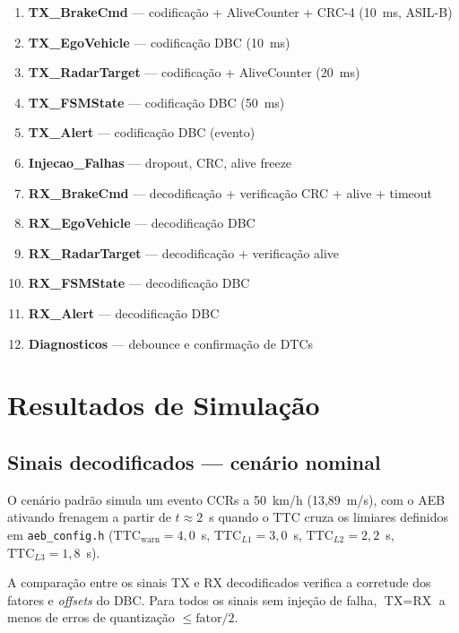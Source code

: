 \documentclass[12pt,a4paper]{article}
\begin{document}
\begin{enumerate}
  \item \textbf{TX\_BrakeCmd} --- codificação + AliveCounter + CRC-4
    (10~ms, ASIL-B)
  \item \textbf{TX\_EgoVehicle} --- codificação DBC (10~ms)
  \item \textbf{TX\_RadarTarget} --- codificação + AliveCounter (20~ms)
  \item \textbf{TX\_FSMState} --- codificação DBC (50~ms)
  \item \textbf{TX\_Alert} --- codificação DBC (evento)
  \item \textbf{Injecao\_Falhas} --- dropout, CRC, alive freeze
  \item \textbf{RX\_BrakeCmd} --- decodificação + verificação CRC + alive + timeout
  \item \textbf{RX\_EgoVehicle} --- decodificação DBC
  \item \textbf{RX\_RadarTarget} --- decodificação + verificação alive
  \item \textbf{RX\_FSMState} --- decodificação DBC
  \item \textbf{RX\_Alert} --- decodificação DBC
  \item \textbf{Diagnosticos} --- debounce e confirmação de DTCs
\end{enumerate}

\section{Resultados de Simulação}
\label{sec:resultados}

\subsection{Sinais decodificados --- cenário nominal}

O cenário padrão simula um evento CCRs a 50~km/h (13,89~m/s), com
o AEB ativando frenagem a partir de $t \approx 2$~s quando o TTC
cruza os limiares definidos em \texttt{aeb\_config.h}
($\text{TTC}_{\text{warn}} = 4{,}0$~s,
 $\text{TTC}_{L1} = 3{,}0$~s, $\text{TTC}_{L2} = 2{,}2$~s,
 $\text{TTC}_{L3} = 1{,}8$~s).

\begin{tcolorbox}[notabox]
  A comparação entre os sinais TX e RX decodificados verifica a corretude
  dos fatores e \textit{offsets} do DBC. Para todos os sinais sem injeção
  de falha, $\text{TX} = \text{RX}$ a menos de erros de quantização
  $\leq \text{fator}/2$.
\end{tcolorbox}
\end{document}
